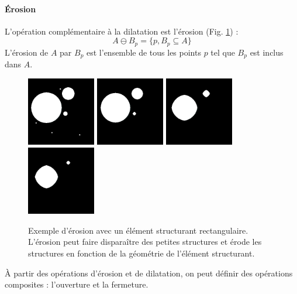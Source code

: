 \paragraph{Érosion}
L'opération complémentaire à la dilatation est l'érosion (Fig. \ref{fig:morpho_erosion}) :
\begin{equation}
  A \ominus B_p = \{p, B_p \subseteq A\}
\end{equation}
L'érosion de $A$ par $B_p$ est l'ensemble de tous les points $p$ tel que $B_p$ est inclus dans $A$. 
\begin{figure}[h]
  \centering
  \includegraphics[height=3cm]{Images/morpho_init.png}
  \includegraphics[height=3cm]{Images/morpho_erode_k5.png}
  \includegraphics[height=3cm]{Images/morpho_erode_k21.png}
  \includegraphics[height=3cm]{Images/morpho_erode_k31.png}
  \caption{Exemple d'érosion avec un élément structurant rectangulaire. L'érosion peut faire disparaître des petites structures et érode les structures en fonction de la géométrie de l'élément structurant.}
  \label{fig:morpho_erosion}
\end{figure}
À partir des opérations d'érosion et de dilatation, on peut définir des opérations composites : l'ouverture et la fermeture.
